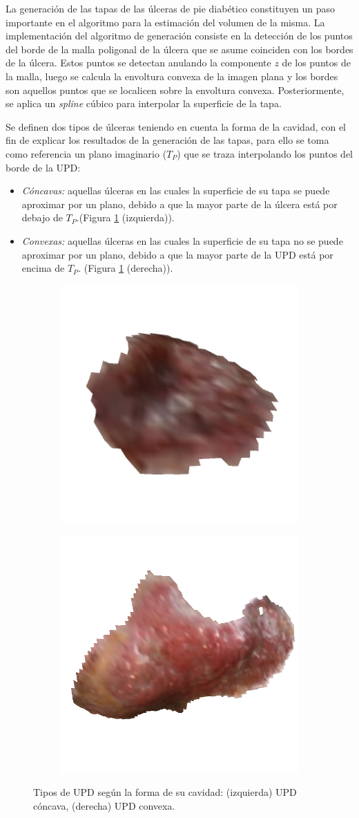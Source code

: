 La generación de las tapas de las úlceras de pie diabético constituyen un paso importante en el algoritmo para la estimación del volumen de la misma. La implementación del algoritmo de generación consiste en la detección de los puntos del borde de la malla poligonal de la úlcera que se asume coinciden con los bordes de la úlcera. Estos puntos se detectan anulando la componente $z$ de los puntos de la malla, luego se calcula la envoltura convexa de la imagen plana y los bordes son aquellos puntos que se localicen sobre la envoltura convexa. Posteriormente, se aplica un \textit{spline} cúbico para interpolar la superficie de la tapa.

Se definen dos tipos de úlceras teniendo en cuenta la forma de la cavidad, con el fin de explicar los resultados de la generación de las tapas, para ello se toma como referencia un plano imaginario ($T_P$) que se traza interpolando los puntos del borde de la UPD:

\begin{itemize}
	\item \textit{Cóncavas:} aquellas úlceras en las cuales la superficie de su tapa se puede aproximar por un plano, debido a que la mayor parte de la úlcera está por debajo de $T_P$.(Figura \ref{fig:planar} (izquierda)).
	\item \textit{Convexas:} aquellas úlceras en las cuales la superficie de su tapa no se puede aproximar por un plano, debido a que la mayor parte de la UPD está por encima de $T_P$. (Figura \ref{fig:planar} (derecha)).
\end{itemize}

\begin{figure}[ht]
	\centering
	\begin{subfigure}
		\centering
		\includegraphics[width=.25\linewidth]{./Graphics/planar.png}
	\end{subfigure}
	\begin{subfigure}
		\centering
		\includegraphics[width=.25\linewidth]{./Graphics/noPlanar.png}
	\end{subfigure}
	\caption{Tipos de UPD según la forma de su cavidad: (izquierda) UPD cóncava, (derecha) UPD convexa.}
	\label{fig:planar}
\end{figure}

